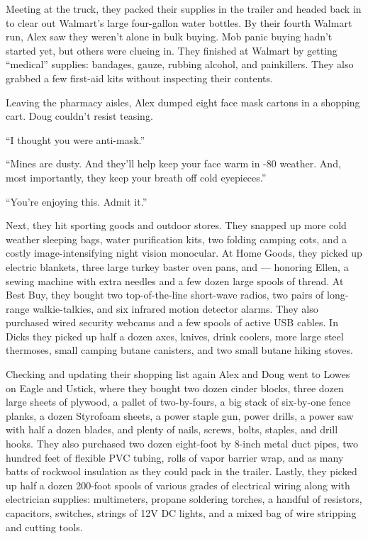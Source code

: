 Meeting at the truck, they packed their supplies in the trailer and
headed back in to clear out Walmart's large four-gallon water bottles.
By their fourth Walmart run, Alex saw they weren't alone in bulk buying.
Mob panic buying hadn't started yet, but others were clueing in. They
finished at Walmart by getting ``medical'' supplies: bandages, gauze,
rubbing alcohol, and painkillers. They also grabbed a few first-aid kits
without inspecting their contents.

Leaving the pharmacy aisles, Alex dumped eight face mask cartons in a
shopping cart. Doug couldn't resist teasing.

``I thought you were anti-mask.''

``Mines are dusty. And they'll help keep your face warm in -80 weather.
And, most importantly, they keep your breath off cold eyepieces.''

``You're enjoying this. Admit it.''

Next, they hit sporting goods and outdoor stores. They snapped up more
cold weather sleeping bags, water purification kits, two folding camping
cots, and a costly image-intensifying night vision monocular. At Home
Goods, they picked up electric blankets, three large turkey baster oven
pans, and --- honoring Ellen, a sewing machine with extra needles and a
few dozen large spools of thread. At Best Buy, they bought two
top-of-the-line short-wave radios, two pairs of long-range
walkie-talkies, and six infrared motion detector alarms. They also
purchased wired security webcams and a few spools of active USB cables.
In Dicks they picked up half a dozen axes, knives, drink coolers, more
large steel thermoses, small camping butane canisters, and two small
butane hiking stoves.

Checking and updating their shopping list again Alex and Doug went to
Lowes on Eagle and Ustick, where they bought two dozen cinder blocks,
three dozen large sheets of plywood, a pallet of two-by-fours, a big
stack of six-by-one fence planks, a dozen Styrofoam sheets, a power
staple gun, power drills, a power saw with half a dozen blades, and
plenty of nails, screws, bolts, staples, and drill hooks. They also
purchased two dozen eight-foot by 8-inch metal duct pipes, two hundred
feet of flexible PVC tubing, rolls of vapor barrier wrap, and as many
batts of rockwool insulation as they could pack in the trailer. Lastly,
they picked up half a dozen 200-foot spools of various grades of
electrical wiring along with electrician supplies: multimeters, propane
soldering torches, a handful of resistors, capacitors, switches, strings
of 12V DC lights, and a mixed bag of wire stripping and cutting tools.

